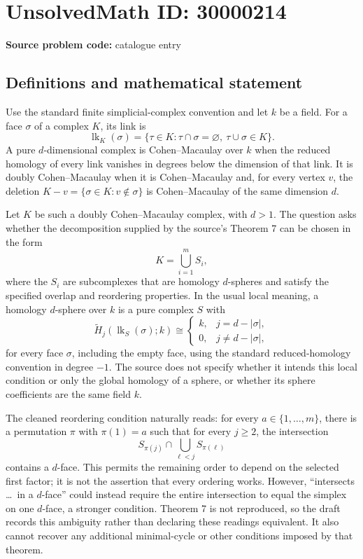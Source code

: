 \documentclass[11pt]{article}
\begin{document}
\section*{UnsolvedMath ID: 30000214}
\textbf{Source problem code:} catalogue entry
\subsection{Definitions and mathematical statement}
Use the standard finite simplicial-complex convention and let \(k\) be a field. For a face \(\sigma\) of a complex \(K\), its link is
\[
 \operatorname{lk}_K(\sigma)=\{\tau\in K:\tau\cap\sigma=\varnothing,\ \tau\cup\sigma\in K\}.
\]
A pure \(d\)-dimensional complex is Cohen--Macaulay over \(k\) when the reduced homology of every link vanishes in degrees below the dimension of that link. It is doubly Cohen--Macaulay when it is Cohen--Macaulay and, for every vertex \(v\), the deletion \(K-v=\{\sigma\in K:v\notin\sigma\}\) is Cohen--Macaulay of the same dimension \(d\).

Let \(K\) be such a doubly Cohen--Macaulay complex, with \(d>1\). The question asks whether the decomposition supplied by the source's Theorem 7 can be chosen in the form
\[
 K=\bigcup_{i=1}^m S_i,
\]
where the \(S_i\) are subcomplexes that are homology \(d\)-spheres and satisfy the specified overlap and reordering properties. In the usual local meaning, a homology \(d\)-sphere over \(k\) is a pure complex \(S\) with
\[
 \widetilde H_j(\operatorname{lk}_S(\sigma);k)\cong
 \begin{cases}k,&j=d-|\sigma|,\\0,&j\ne d-|\sigma|,\end{cases}
\]
for every face \(\sigma\), including the empty face, using the standard reduced-homology convention in degree \(-1\). The source does not specify whether it intends this local condition or only the global homology of a sphere, or whether its sphere coefficients are the same field \(k\).

The cleaned reordering condition naturally reads: for every \(a\in\{1,\ldots,m\}\), there is a permutation \(\pi\) with \(\pi(1)=a\) such that for every \(j\geq2\), the intersection
\[
 S_{\pi(j)}\cap\bigcup_{\ell<j}S_{\pi(\ell)}
\]
contains a \(d\)-face. This permits the remaining order to depend on the selected first factor; it is not the assertion that every ordering works. However, ``intersects \dots\ in a \(d\)-face'' could instead require the entire intersection to equal the simplex on one \(d\)-face, a stronger condition. Theorem 7 is not reproduced, so the draft records this ambiguity rather than declaring these readings equivalent. It also cannot recover any additional minimal-cycle or other conditions imposed by that theorem.
\end{document}
